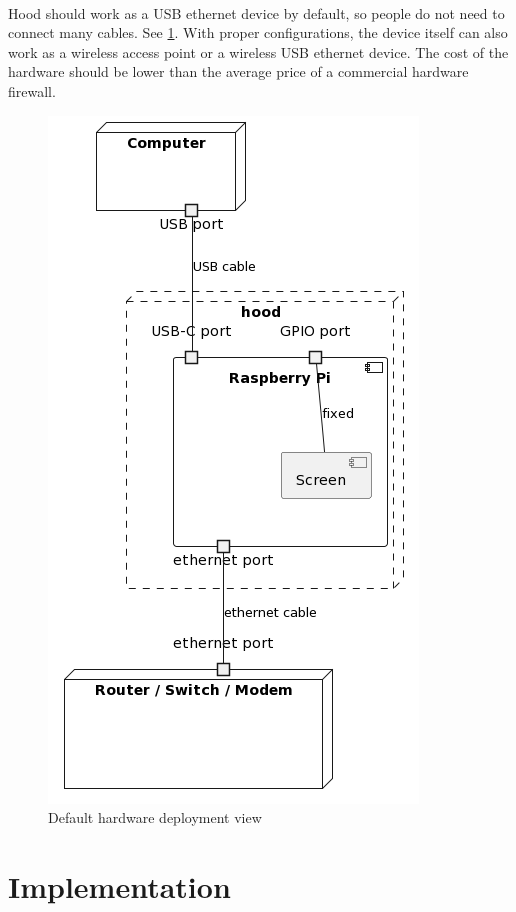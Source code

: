 \documentclass[mscthesis]{usiinfthesis}
\begin{document}
\paragraph{}
Hood should work as a USB ethernet device by default, so people do not need to connect many cables. See \cref{fig:hardware-deployment-view}. With proper configurations, the device itself can also work as a wireless access point or a wireless USB ethernet device. The cost of the hardware should be lower than the average price of a commercial hardware firewall.
\begin{figure}[H]
  \includegraphics[scale=1]{graphics/puml/hardware-deployment-view.png}
  \caption{Default hardware deployment view}
  \label{fig:hardware-deployment-view}
\end{figure}

\section{Implementation}
\end{document}
